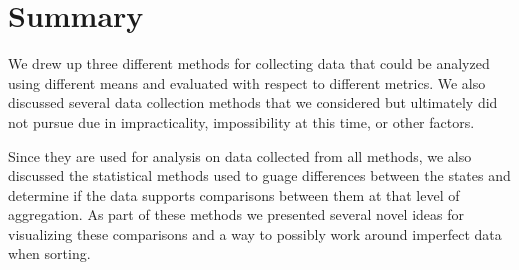 \section{Summary}

We drew up three different methods for collecting data that could be analyzed using different means and evaluated with respect to different metrics. We also discussed several data collection methods that we considered but ultimately did not pursue due in impracticality, impossibility at this time, or other factors.

Since they are used for analysis on data collected from all methods, we also discussed the statistical methods used to guage differences between the states and determine if the data supports comparisons between them at that level of aggregation. As part of these methods we presented several novel ideas for visualizing these comparisons and a way to possibly work around imperfect data when sorting.
